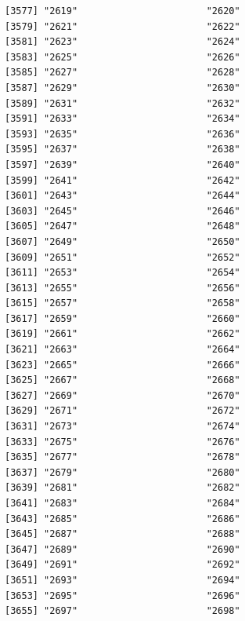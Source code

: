 \documentclass[
  letterpaper,
  DIV=11,
  numbers=noendperiod]{scrreprt}
\begin{document}
\begin{verbatim}
[3577] "2619"                       "2620"                      
[3579] "2621"                       "2622"                      
[3581] "2623"                       "2624"                      
[3583] "2625"                       "2626"                      
[3585] "2627"                       "2628"                      
[3587] "2629"                       "2630"                      
[3589] "2631"                       "2632"                      
[3591] "2633"                       "2634"                      
[3593] "2635"                       "2636"                      
[3595] "2637"                       "2638"                      
[3597] "2639"                       "2640"                      
[3599] "2641"                       "2642"                      
[3601] "2643"                       "2644"                      
[3603] "2645"                       "2646"                      
[3605] "2647"                       "2648"                      
[3607] "2649"                       "2650"                      
[3609] "2651"                       "2652"                      
[3611] "2653"                       "2654"                      
[3613] "2655"                       "2656"                      
[3615] "2657"                       "2658"                      
[3617] "2659"                       "2660"                      
[3619] "2661"                       "2662"                      
[3621] "2663"                       "2664"                      
[3623] "2665"                       "2666"                      
[3625] "2667"                       "2668"                      
[3627] "2669"                       "2670"                      
[3629] "2671"                       "2672"                      
[3631] "2673"                       "2674"                      
[3633] "2675"                       "2676"                      
[3635] "2677"                       "2678"                      
[3637] "2679"                       "2680"                      
[3639] "2681"                       "2682"                      
[3641] "2683"                       "2684"                      
[3643] "2685"                       "2686"                      
[3645] "2687"                       "2688"                      
[3647] "2689"                       "2690"                      
[3649] "2691"                       "2692"                      
[3651] "2693"                       "2694"                      
[3653] "2695"                       "2696"                      
[3655] "2697"                       "2698"                      

\end{verbatim}
\end{document}
